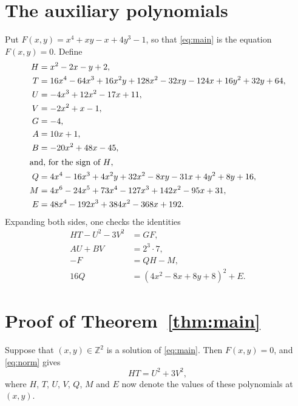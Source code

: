 \documentclass[11pt]{article}
\newcommand{\Z}{\mathbb{Z}}
\begin{document}
\section{The auxiliary polynomials}

Put $F(x,y)=x^{4}+xy-x+4y^{3}-1$, so that \eqref{eq:main} is the equation $F(x,y)=0$. Define
\begin{align*}
H&=x^{2}-2x-y+2,\\
T&=16x^{4}-64x^{3}+16x^{2}y+128x^{2}-32xy-124x+16y^{2}+32y+64,\\
U&=-4x^{3}+12x^{2}-17x+11,\\
V&=-2x^{2}+x-1,\\
G&=-4,\\
A&=10x+1,\\
B&=-20x^{2}+48x-45,\\
\intertext{and, for the sign of $H$,}
Q&=4x^{4}-16x^{3}+4x^{2}y+32x^{2}-8xy-31x+4y^{2}+8y+16,\\
M&=4x^{6}-24x^{5}+73x^{4}-127x^{3}+142x^{2}-95x+31,\\
E&=48x^{4}-192x^{3}+384x^{2}-368x+192.
\end{align*}
Expanding both sides, one checks the identities
\begin{align}
HT-U^2-3V^2&=GF,\label{eq:norm}\\
AU+BV&=2^{3}\cdot 7,\label{eq:bezout}\\
-F&=QH-M,\label{eq:sign}\\
16Q&=(4x^{2}-8x+8y+8)^2+E.\label{eq:sign2}
\end{align}

\section{Proof of Theorem~\ref{thm:main}}

Suppose that $(x,y)\in\Z^2$ is a solution of \eqref{eq:main}. Then $F(x,y)=0$, and \eqref{eq:norm} gives
\begin{equation}\label{eq:HT}
HT=U^2+3V^2,
\end{equation}
where $H$, $T$, $U$, $V$, $Q$, $M$ and $E$ now denote the values of these polynomials at $(x,y)$.
\end{document}
